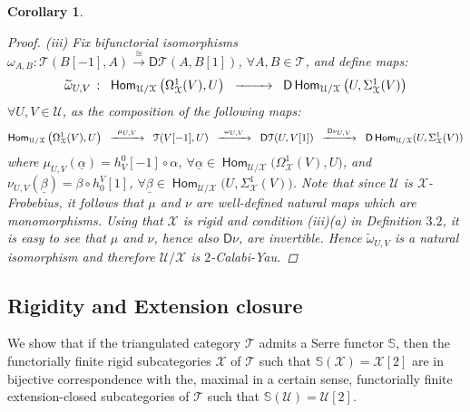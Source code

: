 \documentclass[oneside, a4paper,reqno]{amsart}
\numberwithin{equation}{section}
\newtheorem{cor}[thm]{Corollary}
\theoremstyle{definition}
\begin{document}
\begin{cor}
\begin{proof}
(iii) Fix bifunctorial isomorphisms $\omega_{A,B} \colon {\mathcal T}(B[-1],A) \stackrel{\cong}{\longrightarrow} \mathsf{D}{\mathcal T}(A,B[1])$, $\forall A,B\in {\mathcal T}$, and define maps:
\[
\begin{CD}
\widetilde{\omega}_{U,V} \,\, \colon \,\, \operatorname{\mathsf{Hom}}_{{\mathcal U}/{\mathcal X}}\big(\Omega^{1}_{\mathcal X}(V), U\big)  \,\, @>  >> \,\,   \mathsf{D}\operatorname{\mathsf{Hom}}_{{\mathcal U}/{\mathcal X}}\big(U,\Sigma^{1}_{\mathcal X}(V) \big)
\end{CD}
\]
$\forall U,V \in {\mathcal U}$, as the composition of the following maps:
\[
\small{\begin{CD}
\operatorname{\mathsf{Hom}}_{{\mathcal U}/{\mathcal X}}\big(\Omega^{1}_{\mathcal X}(V), U\big)  \,\, @> \mu_{U,V} >> \,\, {\mathcal T}(V[-1],U) \,\, @> \omega_{U,V} >> \,\, 
\mathsf{D}{\mathcal T}(U,V[1])  \,\, @> \mathsf{D}\nu_{U,V} >> \,\,   \mathsf{D}\operatorname{\mathsf{Hom}}_{{\mathcal U}/{\mathcal X}}(U,\Sigma^{1}_{\mathcal X}(V)) 
\end{CD}}
\]
where $\mu_{U,V}(\underline{\alpha}) = h^{0}_{V}[-1] \circ \alpha$, $\forall \underline{\alpha} \in \operatorname{\mathsf{Hom}}_{{\mathcal U}/{\mathcal X}}\big(\Omega^{1}_{\mathcal X}(V), U\big)$, and $\nu_{U,V}(\underline{\beta}) = \beta\circ h^{V}_{0}[1]$, $\forall \underline{\beta} \in \operatorname{\mathsf{Hom}}_{{\mathcal U}/{\mathcal X}}\big(U,\Sigma^{1}_{\mathcal X}(V)\big)$. 
Note that since ${\mathcal U}$ is ${\mathcal X}$-Frobebius, it follows that $\mu$ and $\nu$ are well-defined natural maps which are monomorphisms. Using that ${\mathcal X}$ is rigid and condition (iii)(a) in Definition $3.2$, it is easy to see that $\mu$ and $\nu$, hence also $\mathsf{D}\nu$, are invertible. Hence $ \widetilde{\omega}_{U,V}$ is a natural isomorphism and therefore  ${\mathcal U}/{\mathcal X}$ is $2$-Calabi-Yau. 
\end{proof}
\end{cor}

\subsection{Rigidity and Extension closure} We show that if the triangulated category ${\mathcal T}$ admits a Serre functor $\mathbb S$, then  the functorially finite rigid subcategories ${\mathcal X}$ of ${\mathcal T}$ such that $\mathbb S({\mathcal X}) = {\mathcal X}[2]$ are in bijective correspondence with the, maximal in a certain sense, functorially finite extension-closed subcategories of ${\mathcal T}$ such that $\mathbb S({\mathcal U}) = {\mathcal U}[2]$. 
\end{document}
